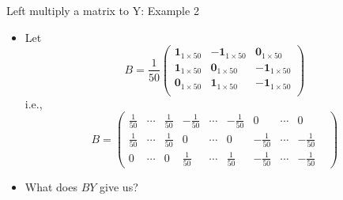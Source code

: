 \documentclass[
  ignorenonframetext,
]{beamer}
\begin{document}
\begin{frame}{Left multiply a matrix to Y: Example 2}
\protect\hypertarget{left-multiply-a-matrix-to-y-example-2}{}
\begin{itemize}
\item
  Let \[B=\frac{1}{50}\begin{pmatrix}
  \mathbf 1_{1\times 50} & -\mathbf 1_{1\times 50} & \mathbf 0_{1\times 50}\\
  \mathbf 1_{1\times 50} & \mathbf 0_{1\times 50} & -\mathbf 1_{1\times 50} \\
  \mathbf 0_{1\times 50} & \mathbf 1_{1\times 50} & -\mathbf 1_{1\times 50} \\
  \end{pmatrix}\] i.e., \[B=\begin{pmatrix}
  \frac{1}{50}& \cdots& \frac{1}{50}&
  -\frac{1}{50}& \cdots& -\frac{1}{50}&
  0 & \cdots & 0\\
  \frac{1}{50}& \cdots& \frac{1}{50}&
  0 & \cdots & 0 &
  -\frac{1}{50}& \cdots& -\frac{1}{50}&\\
  0 & \cdots & 0 &
  \frac{1}{50}& \cdots& \frac{1}{50}&
  -\frac{1}{50}& \cdots& -\frac{1}{50}&
  \end{pmatrix}\]
\item
  What does \(BY\) give us?
\end{itemize}
\end{frame}
\end{document}
